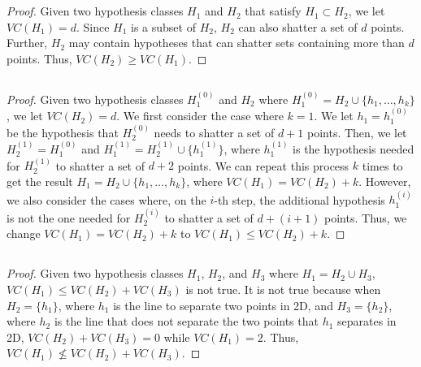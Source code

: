 \documentclass[11pt,a4paper,titlepage]{article}
\begin{document}
\section{}{
\subsection{}{
\begin{proof}
Given two hypothesis classes $H_1$ and $H_2$ that satisfy $H_1 \subset H_2$, we let $VC(H_1) = d$. Since $H_1$ is a subset of $H_2$, $H_2$ can also shatter a set of $d$ points. Further, $H_2$ may contain hypotheses that can shatter sets containing more than $d$ points. Thus, $VC(H_2) \geq VC(H_1)$.
\end{proof}
}\label{prob:4a}
\subsection{}{
\begin{proof}
Given two hypothesis classes $H_1^{(0)}$ and $H_2$ where $H_1^{(0)} = H_2 \cup \{h_1,\ldots, h_k\}$, we let $VC(H_2) = d$. 
\quad We first consider the case where $k=1$. We let $h_1 = h_1^{(0)}$ be the hypothesis that $H_2^{(0)}$ needs to shatter a set of $d+1$ points. Then, we let $H_2^{(1)} = H_1^{(0)}$ and $H_1^{(1)} = H_2^{(1)} \cup \{h_1^{(1)}\}$, where $h_1^{(1)}$ is the hypothesis needed for $H_2^{(1)}$ to shatter a set of $d+2$ points. We can repeat this process $k$ times to get the result $H_1 = H_2 \cup \{h_1,\ldots, h_k\}$, where $VC(H_1) = VC(H_2) + k$. 
\quad However, we also consider the cases where, on the $i$-th step, the additional hypothesis $h_1^{(i)}$ is not the one needed for $H_2^{(i)}$ to shatter a set of $d+(i+1)$ points. Thus, we change $VC(H_1) = VC(H_2) + k$ to $VC(H_1) \leq VC(H_2) + k$.
\end{proof}
}\label{prob:4b}
\subsection{}{
\begin{proof}
Given two hypothesis classes $H_1$, $H_2$, and $H_3$ where $H_1 = H_2 \cup H_3$, $VC(H_1) \leq VC(H_2) + VC(H_3)$ is not true. It is not true because when $H_2 = \{h_1\}$, where $h_1$ is the line to separate two points in 2D, and $H_3 = \{h_2\}$, where $h_2$ is the line that does not separate the two points that $h_1$ separates in 2D, $VC(H_2) + VC(H_3) = 0$ while $VC(H_1) = 2$. Thus, $VC(H_1) \nleq VC(H_2) + VC(H_3)$.
\end{proof}
}\label{prob:4c}
}\label{problem 4}
\end{document}
